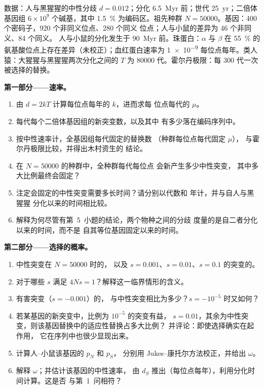 \begin{problem}
\label{pb:b3:molecular-evolution:1}
数据：人与黑猩猩的中性分歧 $d = 0.012$；分化
\qty{6.5}{Myr} 前；世代 \qty{25}{yr}；二倍体基因组 $6\times
10^{9}$ 个碱基，其中 \qty{1.5}{\%} 为编码区。祖先种群 $N =
\num{50000}$。基因：400 个密码子，920 个非同义位点、280 个同义
位点；人与小鼠的差异为 46 个非同义、84 个同义。
人与小鼠的分化发生于 \qty{90}{Myr} 前。珠蛋白：$\alpha$ 与 $\beta$ 在
\qty{55}{\%} 的氨基酸位点上存在差异（未校正）；血红蛋白速率为 \num{1e-9}
每位点每年。类人猿：大猩猩与黑猩猩两次分化之间的 $T$
为 \num{80000} 代。霍尔丹极限：每
300 代一次被选择的替换。

\medskip
\noindent\textbf{第一部分——速率。}
\begin{enumerate}
  \item 由 $d = 2kT$ 计算每位点每年的 $k$，进而求每
        位点每代的 $\mu$。
  \item 每代每个二倍体基因组的新突变数，以及其中
        有多少落在编码序列中。
  \item 按中性速率计，全基因组每代固定的替换数
        （种群每位点每代固定 $\mu$），
        与霍尔丹极限比较，并得出木村资生的
        结论。
  \item 在 $N = \num{50000}$ 的种群中，全种群每代每位点
        会新产生多少中性突变，
        其中多大比例最终会固定？
  \item 注定会固定的中性突变需要多长时间？请分别以代数和
        年计，并与自人与黑猩猩
        分化以来的时间相比较。
  \item 解释为何尽管有第~5~小题的结论，两个物种之间的分歧
        度量的是自二者分化以来的时间，而不是
        自其等位基因固定以来的时间。
\end{enumerate}

\medskip
\noindent\textbf{第二部分——选择的概率。}
\begin{enumerate}[resume]
  \item 中性突变在 $N = \num{50000}$ 时的，
        以及 $s = 0.001$、$s = 0.01$、$s = 0.1$ 的突变的。
  \item 对于哪些 $s$ 满足 $4Ns = 1$？解释这一临界情形的含义。
  \item 有害突变（$s = -0.001$）的，
        与中性突变相比为多少？$s = -10^{-5}$ 时又如何？
  \item 若某基因的新突变中，比例为 $10^{-5}$ 的突变有益，
        $s = 0.01$，其余为中性突变，则该基因替换中的适应性替换占多大比例？
        并评论：即使选择确实在起作用，
        它在序列中也很少显现出来。
  \item 计算人–小鼠该基因的 $p_{N}$ 和 $p_{S}$，
        分别用 Jukes--康托尔方法校正，并给出 $\omega$。
  \item 解释 $\omega$；并估计该基因的中性速率，
        由 $d_{S}$ 推出（每位点每年），利用分化时间计算。这是否
        与第~1~问相符？
\end{enumerate}


\end{problem}
